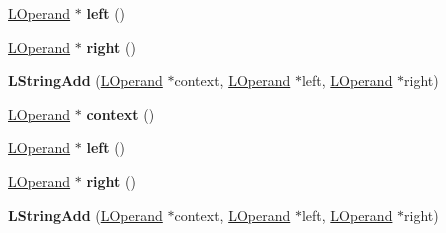 \begin{DoxyCompactItemize}
\item 
\hyperlink{classv8_1_1internal_1_1_l_operand}{L\+Operand} $\ast$ {\bfseries left} ()\hypertarget{classv8_1_1internal_1_1_l_string_add_a67ecfc808a49ae160114f0e53f366037}{}\label{classv8_1_1internal_1_1_l_string_add_a67ecfc808a49ae160114f0e53f366037}

\item 
\hyperlink{classv8_1_1internal_1_1_l_operand}{L\+Operand} $\ast$ {\bfseries right} ()\hypertarget{classv8_1_1internal_1_1_l_string_add_ae0c15e935d032468c5b8e4b12d3dd71f}{}\label{classv8_1_1internal_1_1_l_string_add_ae0c15e935d032468c5b8e4b12d3dd71f}

\item 
{\bfseries L\+String\+Add} (\hyperlink{classv8_1_1internal_1_1_l_operand}{L\+Operand} $\ast$context, \hyperlink{classv8_1_1internal_1_1_l_operand}{L\+Operand} $\ast$left, \hyperlink{classv8_1_1internal_1_1_l_operand}{L\+Operand} $\ast$right)\hypertarget{classv8_1_1internal_1_1_l_string_add_a8c7a0225dcb0347fca518802f8caa913}{}\label{classv8_1_1internal_1_1_l_string_add_a8c7a0225dcb0347fca518802f8caa913}

\item 
\hyperlink{classv8_1_1internal_1_1_l_operand}{L\+Operand} $\ast$ {\bfseries context} ()\hypertarget{classv8_1_1internal_1_1_l_string_add_a607556e17316f1fd938b9e8731005f46}{}\label{classv8_1_1internal_1_1_l_string_add_a607556e17316f1fd938b9e8731005f46}

\item 
\hyperlink{classv8_1_1internal_1_1_l_operand}{L\+Operand} $\ast$ {\bfseries left} ()\hypertarget{classv8_1_1internal_1_1_l_string_add_a67ecfc808a49ae160114f0e53f366037}{}\label{classv8_1_1internal_1_1_l_string_add_a67ecfc808a49ae160114f0e53f366037}

\item 
\hyperlink{classv8_1_1internal_1_1_l_operand}{L\+Operand} $\ast$ {\bfseries right} ()\hypertarget{classv8_1_1internal_1_1_l_string_add_ae0c15e935d032468c5b8e4b12d3dd71f}{}\label{classv8_1_1internal_1_1_l_string_add_ae0c15e935d032468c5b8e4b12d3dd71f}

\item 
{\bfseries L\+String\+Add} (\hyperlink{classv8_1_1internal_1_1_l_operand}{L\+Operand} $\ast$context, \hyperlink{classv8_1_1internal_1_1_l_operand}{L\+Operand} $\ast$left, \hyperlink{classv8_1_1internal_1_1_l_operand}{L\+Operand} $\ast$right)\hypertarget{classv8_1_1internal_1_1_l_string_add_a8c7a0225dcb0347fca518802f8caa913}{}\label{classv8_1_1internal_1_1_l_string_add_a8c7a0225dcb0347fca518802f8caa913}


\end{DoxyCompactItemize}
